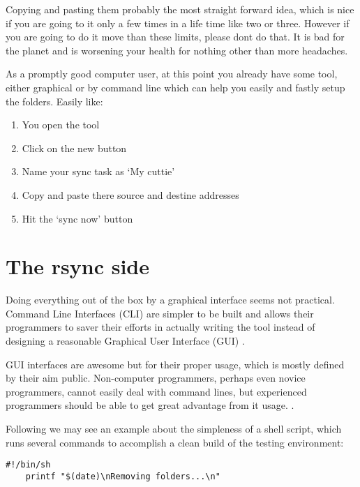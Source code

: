 \begin{englishtext}
    Copying and pasting them probably the most straight forward idea, which is
    nice if you are going to it only a few times in a life time like two or
    three. However if you are going to do it move than these limits,
    please don\q t do that. It is bad for the planet and is worsening your
    health for nothing other than more headaches.

    As a promptly good computer user, at this point you already have some tool,
    either graphical or by command line which can help you easily and fastly
    setup the folder\q s. Easily like:

    \begin{enumerate}
        \item You open the tool
        \item Click on the new button
        \item Name your sync task as `My cuttie'
        \item Copy and paste there source and destine addresses
        \item Hit the `sync now' button
    \end{enumerate}



    \section{The rsync side}

    Doing everything out of the box by a graphical interface seems not
    practical. Command Line Interfaces (CLI) are simpler to be built and allows
    their programmers to saver their efforts in actually writing the tool
    instead of designing a reasonable Graphical User Interface (GUI)
    \cite{quantificationOfInterface}.

    GUI interfaces are awesome but for their proper usage, which is mostly
    defined by their aim public. Non-computer programmers, perhaps even novice
    programmers, cannot easily deal with command lines, but experienced
    programmers should be able to get great advantage from it usage.
    \cite{commandLineInterface}.

    Following we may see an example about the simpleness of a shell script,
    which runs several commands to accomplish a clean build of the testing
    environment:

    \begin{lstlisting}[caption={rebuild\_workspace.sh}]
    #!/bin/sh
    printf "$(date)\nRemoving folders...\n"


\end{lstlisting}
\end{englishtext}
